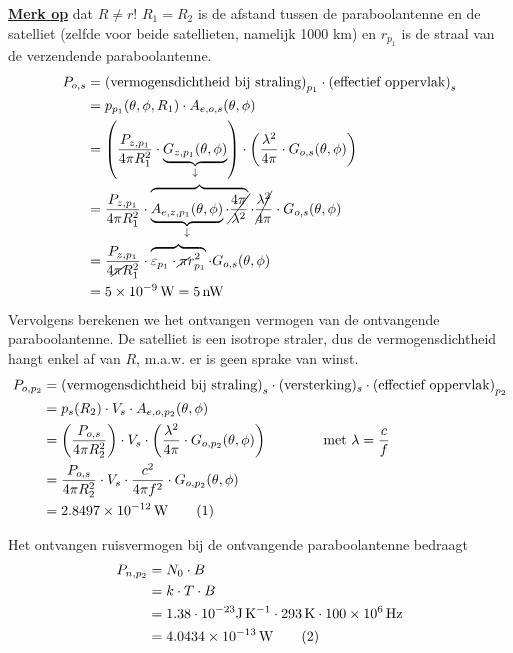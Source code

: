 \documentclass{kuburgiearticle}
\newcommand\numberthis{\addtocounter{equation}{1}\tag{\theequation}}
\begin{document}
	\underline{\textbf{Merk op}} dat \(R\neq r\)! \(R_1=R_2\) is de afstand tussen de paraboolantenne en de satelliet (zelfde voor beide satellieten, namelijk 1000 km) en \(r_{p_1}\) is de straal van de verzendende paraboolantenne.
	\begin{align*}
		P_{o,s} &= \text{(vermogensdichtheid bij straling)}_{p_1} \cdot \text{(effectief oppervlak)}_s \\
		&= p_{p_1}(\theta,\phi,R_1) \cdot A_{e,o,s}(\theta, \phi)\\
		&= \left(\frac{P_{z,p_1}}{4\pi R_1^2}\cdot \underbrace{G_{z,p_1}(\theta,\phi)}_\downarrow \right)\cdot \left(\frac{\lambda^2}{4\pi}\cdot G_{o,s}(\theta, \phi)\right) \\
		&= \frac{P_{z,p_1}}{4\pi R_1^2}\cdot \overbrace{ \underbrace{A_{e,z,p_1}(\theta,\phi)}_\downarrow\cdot \cancel{\frac{4 \pi}{\lambda^2}} } \cdot \cancel{\frac{\lambda^2}{4\pi}}\cdot G_{o,s}(\theta, \phi) \\
		&= \frac{P_{z,p_1}}{4\cancel{\pi} R_1^2}\cdot \overbrace{ \varepsilon_{p_1} \cdot \cancel{\pi} r_{p_1}^2 } \cdot G_{o,s}(\theta, \phi) \\
		&= \SI{5e-9}{\watt} = \SI{5}{\nano\watt}
	\end{align*}
	Vervolgens berekenen we het ontvangen vermogen van de ontvangende paraboolantenne. De satelliet is een isotrope straler, dus de vermogensdichtheid hangt enkel af van \(R\), m.a.w. er is geen sprake van winst.
	\begin{align*}
		P_{o,p_2} &= \text{(vermogensdichtheid bij straling)}_s \cdot (\text{versterking})_s \cdot \text{(effectief oppervlak)}_{p_2} \\
		&= p_{s}(R_2) \cdot V_s \cdot A_{e,o,p_2}(\theta, \phi)\\
		&= \left(\frac{P_{o,s}}{4\pi R_2^2} \right) \cdot V_s \cdot \left(\frac{\lambda^2}{4\pi}\cdot G_{o,p_2}(\theta, \phi)\right) \qquad \qquad \text{met } \lambda = \frac{c}{f} \\
		&= \frac{P_{o,s}}{4\pi R_2^2} \cdot V_s \cdot \frac{c^2}{4\pi f^2}\cdot G_{o,p_2}(\theta, \phi) \\
		&= \SI{2.8497e-12}{\watt} \numberthis \label{ontvangen_vermogen}
	\end{align*}

	Het ontvangen ruisvermogen bij de ontvangende paraboolantenne bedraagt
	\begin{align*}
		P_{n,p_2} &= N_0 \cdot B \\
		&= k \cdot T \cdot B \\
		&= 1.38 \cdot 10^{-23} \unit{\joule\per\kelvin} \cdot \SI{293}{K} \cdot \SI{100e6}{\hertz}\\
		&= \SI{4.0434e-13}{W} \numberthis \label{ruisvermogen}
	\end{align*}
\end{document}
